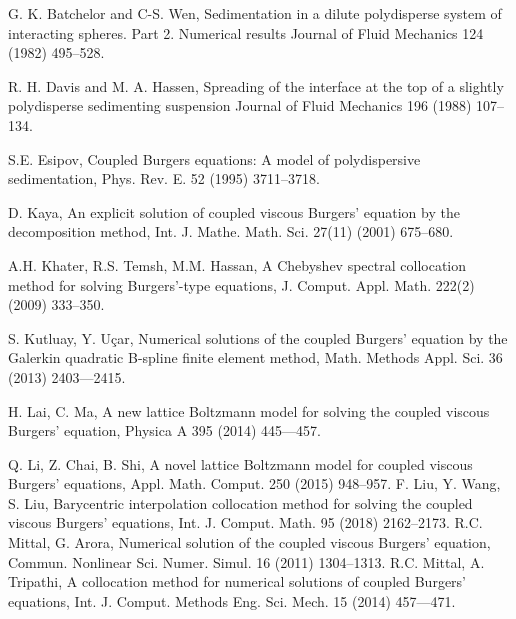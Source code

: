 \documentclass{amsart}
\theoremstyle{definition}
\numberwithin{equation}{section}
\begin{document}
\begin{thebibliography}{10}
        {G. K. Batchelor and C-S. Wen}, 
        {Sedimentation in a dilute polydisperse system of interacting spheres. Part 2. Numerical results} 
        Journal of Fluid Mechanics 124 (1982) 495--528.

        {R. H. Davis and M. A. Hassen},
        {Spreading of the interface at the top of a slightly polydisperse sedimenting suspension}
        Journal of Fluid Mechanics {196} (1988) 107--134.        

        {S.E. Esipov}, 
        {Coupled Burgers equations: A model of polydispersive sedimentation},
        Phys. Rev. E. 52 (1995) 3711--3718. 
        
        
        
        {D. Kaya},
        {An explicit solution of coupled viscous Burgers' equation by the decomposition method},
        Int. J. Mathe. Math. Sci. 27(11) (2001) 675--680.

        {A.H. Khater, R.S. Temsh, M.M. Hassan},
        {A Chebyshev spectral collocation method for solving Burgers'-type equations},
        J. Comput. Appl. Math. 222(2) (2009) 333--350.


        {S. Kutluay, Y. U\c{c}ar},
        {Numerical solutions of the coupled Burgers' equation by the Galerkin quadratic B-spline finite element method},
        Math. Methods Appl. Sci. 36 (2013) 2403—2415.

        {H. Lai, C. Ma},
        {A new lattice Boltzmann model for solving the coupled viscous Burgers' equation},
        Physica A 395 (2014) 445—457.

        {Q. Li, Z. Chai, B. Shi},
        {A novel lattice Boltzmann model for coupled viscous Burgers' equations},
        Appl. Math. Comput. 250 (2015) 948--957.
        {F. Liu, Y. Wang, S. Liu},
        {Barycentric interpolation collocation method for solving the coupled viscous Burgers' equations},
        Int. J. Comput. Math. 95 (2018) 2162--2173.
        {R.C. Mittal, G. Arora},
        {Numerical solution of the coupled viscous Burgers' equation},
        Commun. Nonlinear Sci. Numer. Simul. 16 (2011) 1304--1313.
        {R.C. Mittal, A. Tripathi},
        {A collocation method for numerical solutions of coupled Burgers' equations},
        Int. J. Comput. Methods Eng. Sci. Mech. 15 (2014) 457—471.
        

\end{thebibliography}
\end{document}
